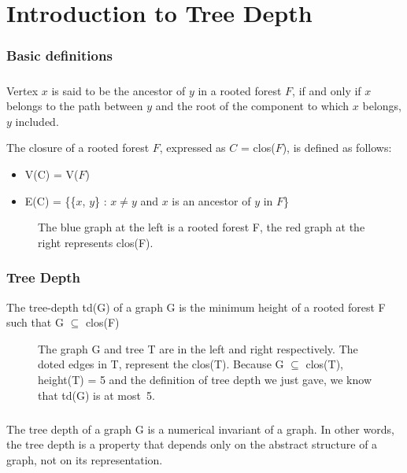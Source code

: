 \chapter{Introduction to Tree Depth}

\subsection{Basic definitions}

\paragraph{}
Vertex $x$ is said to be the ancestor of $y$ in a rooted forest $F$, if and only if $x$ belongs to the path between $y$ and the root of the component to which $x$ belongs, $y$ included.

\begin{definition}
The closure of a rooted forest $F$, expressed as $C$ = clos($F$), is defined as follows:
\begin{itemize}
  \item V(C) = V($F$)
  \item E(C) = \{\{$x$, $y$\} : $x \neq y$ and $x$ is an ancestor of $y$ in $F$\}
\end{itemize}
\end{definition}
\begin{figure}[h]

\caption{The blue graph at the left is a rooted forest F, the red graph at the right represents clos(F).}
\end{figure}

\subsection{Tree Depth}

\begin{definition}
The tree-depth td(G) of a graph G is the minimum height of a rooted forest F such that G $\subseteq$ clos(F)
\end{definition}

\begin{figure}[H]

\caption{The graph G and tree T are in the left and right respectively. The doted edges in T, represent the clos(T). Because G $\subseteq$ clos(T), height(T) = 5 and the definition of tree depth we just gave, we know that td(G) is at most~5.\label{fig:3d-cube}}
\end{figure}
\paragraph{}
The tree depth of a graph G is a numerical invariant of a graph. In other words, the tree depth is a property that depends only  on the abstract structure of a graph, not on its representation.	

